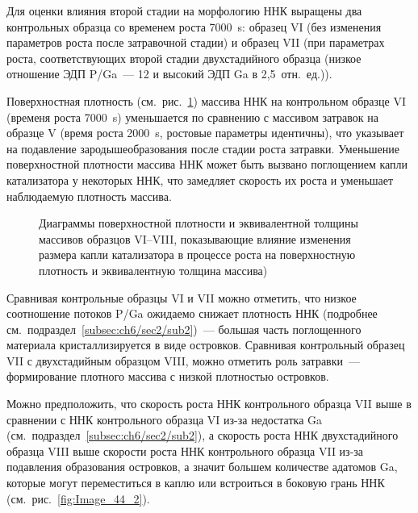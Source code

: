 Для оценки влияния второй стадии на морфологию ННК выращены два контрольных образца со временем роста 7000~\si{\second}: образец VI (без изменения параметров роста после затравочной стадии) и образец VII (при параметрах роста, соответствующих второй стадии двухстадийного образца (низкое отношение ЭДП P/Ga~--- 12 и высокий ЭДП Ga в 2,5~отн.~ед.)).

Поверхностная плотность (см.~рис.~\cref{fig:Image_44_1}) массива ННК на контрольном образце VI (временя роста 7000~\si{\second}) уменьшается по сравнению с массивом затравок на образце V (время роста 2000~\si{\second}, ростовые параметры идентичны), что указывает на подавление зародышеобразования после стадии роста затравки. Уменьшение поверхностной плотности массива ННК может быть вызвано поглощением капли катализатора у некоторых ННК, что замедляет скорость их роста и уменьшает наблюдаемую плотность массива.

\begin{figure}[ht]
	\caption{Диаграммы поверхностной плотности и эквивалентной толщины массивов образцов VI--VIII, показывающие влияние изменения размера капли катализатора в процессе роста на поверхностную плотность и эквивалентную толщина массива)}\label{fig:Image_44_1}
\end{figure}

Сравнивая контрольные образцы VI и VII можно отметить, что низкое соотношение потоков P/Ga ожидаемо снижает плотность ННК (подробнее см.~подраздел~\cref{subsec:ch6/sec2/sub2})~--- большая часть поглощенного материала кристаллизируется в виде островков. Сравнивая контрольный образец VII с двухстадийным образцом VIII, можно отметить роль затравки~--- формирование плотного массива с низкой плотностью островков.

Можно предположить, что скорость роста ННК контрольного образца VII выше в сравнении с ННК контрольного образца VI из-за недостатка Ga (см.~подраздел~\cref{subsec:ch6/sec2/sub2}), а скорость роста ННК двухстадийного образца VIII выше скорости роста ННК контрольного образца VII из-за подавления образования островков, а значит большем количестве адатомов Ga, которые могут переместиться в каплю или встроиться в боковую грань ННК (см.~рис.~\cref{fig:Image_44_2}).

